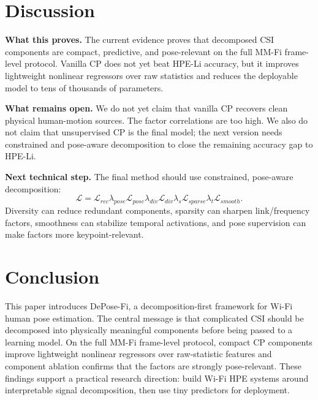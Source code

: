 \documentclass[letterpaper]{article}
\newcommand{\method}{DePose-Fi}
\begin{document}
\section{Discussion}

\textbf{What this proves.}
The current evidence proves that decomposed CSI components are compact, predictive, and pose-relevant on the full MM-Fi frame-level protocol. Vanilla CP does not yet beat HPE-Li accuracy, but it improves lightweight nonlinear regressors over raw statistics and reduces the deployable model to tens of thousands of parameters.

\textbf{What remains open.}
We do not yet claim that vanilla CP recovers clean physical human-motion sources. The factor correlations are too high. We also do not claim that unsupervised CP is the final model; the next version needs constrained and pose-aware decomposition to close the remaining accuracy gap to HPE-Li.

\textbf{Next technical step.}
The final method should use constrained, pose-aware decomposition:
\begin{equation}
\mathcal{L}=
\mathcal{L}_{rec}
\lambda_{pose}\mathcal{L}_{pose}
\lambda_{div}\mathcal{L}_{div}
\lambda_s\mathcal{L}_{sparse}
\lambda_t\mathcal{L}_{smooth}.
\end{equation}
Diversity can reduce redundant components, sparsity can sharpen link/frequency factors, smoothness can stabilize temporal activations, and pose supervision can make factors more keypoint-relevant.

\section{Conclusion}

This paper introduces \method, a decomposition-first framework for Wi-Fi human pose estimation. The central message is that complicated CSI should be decomposed into physically meaningful components before being passed to a learning model. On the full MM-Fi frame-level protocol, compact CP components improve lightweight nonlinear regressors over raw-statistic features and component ablation confirms that the factors are strongly pose-relevant. These findings support a practical research direction: build Wi-Fi HPE systems around interpretable signal decomposition, then use tiny predictors for deployment.
\end{document}
